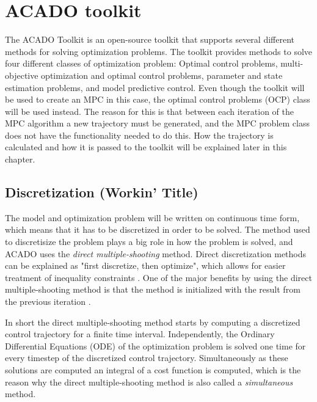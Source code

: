 \section{ACADO toolkit}

The ACADO Toolkit \cite{acadoHOUSKA} is an open-source toolkit that supports several different methods for solving optimization problems. The toolkit provides methods to solve four different classes of optimization problem: Optimal control problems, multi-objective optimization and optimal control problems, parameter and state estimation problems, and model predictive control. Even though the toolkit will be used to create an MPC in this case, the optimal control problems (OCP) class will be used instead. The reason for this is that between each iteration of the MPC algorithm a new trajectory must be generated, and the MPC problem class does not have the functionality needed to do this. How the trajectory is calculated and how it is passed to the toolkit will be explained later in this chapter.



\subsection{Discretization (Workin' Title)}

The model and optimization problem will be written on continuous time form, which means that it has to be discretized in order to be solved. The method used to discretisize the problem plays a big role in how the problem is solved, and ACADO uses the \textit{direct multiple-shooting} method. Direct discretization methods can be explained as "first discretize, then optimize", which allows for easier treatment of inequality constraints \cite{discDIEHL}. One of the major benefits by using the direct multiple-shooting method is that the method is initialized with the result from the previous iteration \cite{stallMATHISEN}.

In short the direct multiple-shooting method starts by computing a discretized control trajectory for a finite time interval. Independently, the Ordinary Differential Equations (ODE) of the optimization problem is solved one time for every timestep of the discretized control trajectory. Simultaneously as these solutions are computed an integral of a cost function is computed, which is the reason why the direct multiple-shooting method is also called a \textit{simultaneous} method. 

